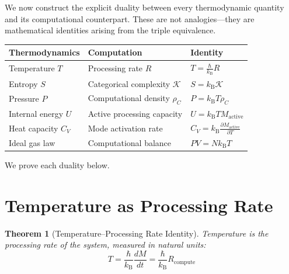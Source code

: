 \documentclass[twocolumn,10pt,a4paper]{article}
\theoremstyle{plain}
\newtheorem{theorem}{Theorem}[section]
\theoremstyle{definition}
\theoremstyle{remark}
\newcommand{\kB}{k_{\mathrm{B}}}
\begin{document}
We now construct the explicit duality between every thermodynamic quantity and its computational counterpart. These are not analogies---they are mathematical identities arising from the triple equivalence.

\begin{center}
\begin{tabular}{lll}
\toprule
\textbf{Thermodynamics} & \textbf{Computation} & \textbf{Identity} \\
\midrule
Temperature $T$ & Processing rate $R$ & $T = \frac{\hbar}{\kB} R$ \\[4pt]
Entropy $S$ & Categorical complexity $\mathcal{K}$ & $S = \kB \mathcal{K}$ \\[4pt]
Pressure $P$ & Computational density $\rho_C$ & $P = \kB T \rho_C$ \\[4pt]
Internal energy $U$ & Active processing capacity & $U = \kB T M_{\mathrm{active}}$ \\[4pt]
Heat capacity $C_V$ & Mode activation rate & $C_V = \kB \frac{\partial M_{\mathrm{active}}}{\partial T}$ \\[4pt]
Ideal gas law & Computational balance & $PV = N\kB T$ \\
\bottomrule
\end{tabular}
\end{center}

We prove each duality below.

\section{Temperature as Processing Rate}
\label{sec:temp_rate}

\begin{theorem}[Temperature--Processing Rate Identity]
\label{thm:temp_rate}
Temperature is the processing rate of the system, measured in natural units:
\begin{equation}
\boxed{T = \frac{\hbar}{\kB} \frac{dM}{dt} = \frac{\hbar}{\kB} R_{\mathrm{compute}}}
\end{equation}
\end{theorem}
\end{document}
